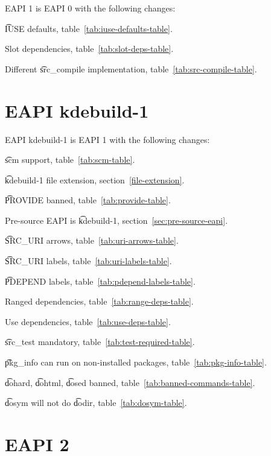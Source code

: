 EAPI 1 is EAPI 0 with the following changes:

\begin{compactitem}
\item \t{IUSE} defaults, table~\ref{tab:iuse-defaults-table}.
\item Slot dependencies, table~\ref{tab:slot-deps-table}.
\item Different \t{src\_compile} implementation, table~\ref{tab:src-compile-table}.
\end{compactitem}

\IFKDEBUILDELSE
{
    \section*{EAPI kdebuild-1}

    EAPI kdebuild-1 is EAPI 1 with the following changes:

    \begin{compactitem}
    \item \t{scm} support, table~\ref{tab:scm-table}.
    \item \t{kdebuild-1} file extension, section~\ref{file-extension}.
    \item \t{PROVIDE} banned, table~\ref{tab:provide-table}.
    \item Pre-source EAPI is \t{kdebuild-1}, section~\ref{sec:pre-source-eapi}.
    \item \t{SRC\_URI} arrows, table~\ref{tab:uri-arrows-table}.
    \item \t{SRC\_URI} labels, table~\ref{tab:uri-labels-table}.
    \item \t{PDEPEND} labels, table~\ref{tab:pdepend-labels-table}.
    \item Ranged dependencies, table~\ref{tab:range-deps-table}.
    \item Use dependencies, table~\ref{tab:use-deps-table}.
    \item \t{src\_test} mandatory, table~\ref{tab:test-required-table}.
    \item \t{pkg\_info} can run on non-installed packages, table~\ref{tab:pkg-info-table}.
    \item \t{dohard}, \t{dohtml}, \t{dosed} banned, table~\ref{tab:banned-commands-table}.
    \item \t{dosym} will not do \t{dodir}, table~\ref{tab:dosym-table}.
    \end{compactitem}
}{
}

\section*{EAPI 2}

